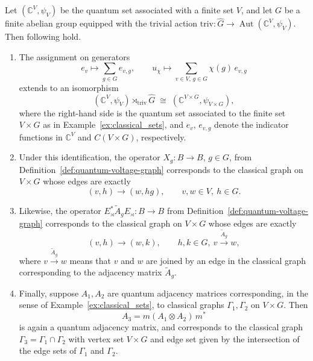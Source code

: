\begin{lemma}
    \label{lem:correspondences}
    Let \( (\mathbb{C}^V, \psi_V) \) be the quantum set associated with
    a finite set \( V \), and let
    \( G \) be a finite abelian group equipped with the trivial action
    \( \mathrm{triv} \colon \widehat{G} \to
    \operatorname{Aut}(\mathbb{C}^V, \psi_V) \).
    Then following hold.
    \begin{enumerate}
        \item The assignment on generators
            \[
                e_v \mapsto \sum_{g \in G} e_{v,g}, \qquad
                u_\chi \mapsto \sum_{v \in V,\, g \in G} \chi(g)\, e_{v,g}
            \]
            extends to an isomorphism
            \[
                (\mathbb{C}^V, \psi_V) \rtimes_{\mathrm{triv}} \widehat{G}
                \;\cong\; (\mathbb{C}^{V \times G}, \psi_{V \times G}),
            \]
            where the right-hand side is the quantum set associated
            to the finite set \( V \times G \) as in
            Example~\ref{ex:classical_sets},
            and \( e_v \), \( e_{v,g} \) denote the indicator functions
            in \( \mathbb{C}^{V} \) and \( C(V \times G) \), respectively.

        \item Under this identification, the operator
            \( X_g \colon B \to B \), \( g \in G \), from
            Definition~\ref{def:quantum-voltage-graph}
            corresponds to the classical graph on \( V \times G \)
            whose edges are exactly
            \[
                (v,h) \to (w, hg), \qquad v,w \in V,\ h \in G.
            \]

        \item Likewise, the operator
            \( E_\rtimes^* \widetilde{A}_g E_\rtimes \colon B \to B \)
            from Definition~\ref{def:quantum-voltage-graph}
            corresponds to the classical graph on \( V \times G \)
            whose edges are exactly
            \[
                (v,h) \to (w,k), \qquad h,k \in G,\ v
                \xrightarrow{\widetilde{A}_g} w,
            \]
            where \( v \xrightarrow{\widetilde{A}_g} w \) means that
            \( v \) and \( w \) are joined by an edge in the classical
            graph corresponding to the adjacency matrix
            \( \widetilde{A}_g \).

        \item Finally, suppose \( A_1, A_2 \) are quantum adjacency
            matrices corresponding, in the sense of
            Example~\ref{ex:classical_sets},
            to classical graphs \( \Gamma_1, \Gamma_2 \) on
            \( V \times G \). Then
            \[
                A_3 = m(A_1 \otimes A_2)\, m^*
            \]
            is again a quantum adjacency matrix, and corresponds to
            the classical graph \( \Gamma_3 = \Gamma_1 \cap \Gamma_2 \)
            with vertex set \( V \times G \) and edge set given by the
            intersection of the edge sets of \( \Gamma_1 \) and
            \( \Gamma_2 \).
    \end{enumerate}
\end{lemma}

